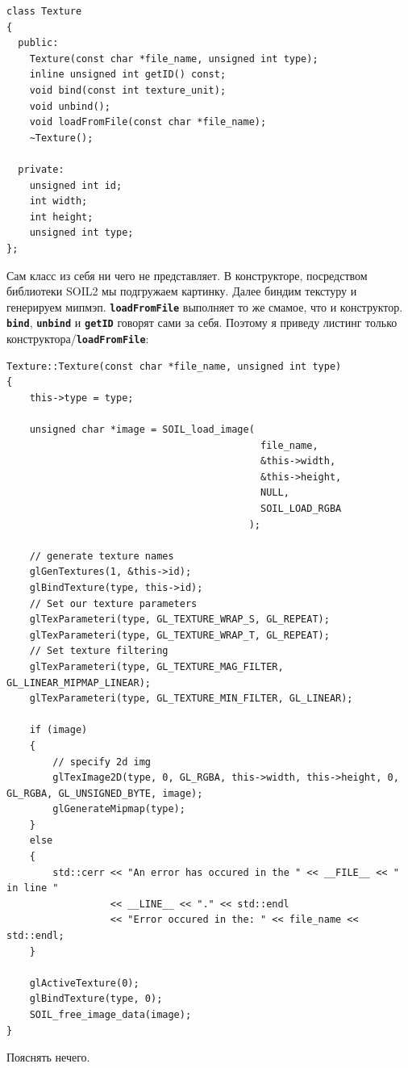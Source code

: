 \documentclass[12pt]{article}
\begin{document}
    \begin{verbatim}
class Texture
{
  public:
    Texture(const char *file_name, unsigned int type);
    inline unsigned int getID() const;
    void bind(const int texture_unit);
    void unbind();
    void loadFromFile(const char *file_name);
    ~Texture();

  private:
    unsigned int id;
    int width;
    int height;
    unsigned int type;
};
    \end{verbatim}
    Сам класс из себя ни чего не представляет. 
    В конструкторе, посредством библиотеки SOIL2 мы подгружаем картинку.
    Далее биндим текстуру и генерируем мипмэп. \texttt{\textbf{loadFromFile}} выполняет
    то же смамое, что и конструктор. \texttt{\textbf{bind}}, \texttt{\textbf{unbind}} и \texttt{\textbf{getID}}
    говорят сами за себя. Поэтому я приведу листинг только конструктора/\texttt{\textbf{loadFromFile}}:
    \begin{verbatim}
Texture::Texture(const char *file_name, unsigned int type)
{
    this->type = type;

    unsigned char *image = SOIL_load_image(
                                            file_name, 
                                            &this->width,
                                            &this->height, 
                                            NULL,
                                            SOIL_LOAD_RGBA
                                          );

    // generate texture names
    glGenTextures(1, &this->id);
    glBindTexture(type, this->id);
    // Set our texture parameters
    glTexParameteri(type, GL_TEXTURE_WRAP_S, GL_REPEAT);
    glTexParameteri(type, GL_TEXTURE_WRAP_T, GL_REPEAT);
    // Set texture filtering
    glTexParameteri(type, GL_TEXTURE_MAG_FILTER, GL_LINEAR_MIPMAP_LINEAR);
    glTexParameteri(type, GL_TEXTURE_MIN_FILTER, GL_LINEAR);

    if (image)
    {
    	// specify 2d img
        glTexImage2D(type, 0, GL_RGBA, this->width, this->height, 0, GL_RGBA, GL_UNSIGNED_BYTE, image);
        glGenerateMipmap(type);
    }
    else
    {
        std::cerr << "An error has occured in the " << __FILE__ << " in line " 
                  << __LINE__ << "." << std::endl
                  << "Error occured in the: " << file_name << std::endl;
    }

    glActiveTexture(0);
    glBindTexture(type, 0);
    SOIL_free_image_data(image);
}
    \end{verbatim}
    Пояснять нечего.
\end{document}
